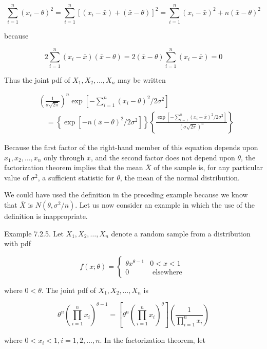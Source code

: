 $$
\sum_{i=1}^{n}\left(x_{i}-\theta\right)^{2}=\sum_{i=1}^{n}\left[\left(x_{i}-\bar{x}\right)+(\bar{x}-\theta)\right]^{2}=\sum_{i=1}^{n}\left(x_{i}-\bar{x}\right)^{2}+n(\bar{x}-\theta)^{2}
$$

because

$$
2 \sum_{i=1}^{n}\left(x_{i}-\bar{x}\right)(\bar{x}-\theta)=2(\bar{x}-\theta) \sum_{i=1}^{n}\left(x_{i}-\bar{x}\right)=0
$$

Thus the joint pdf of $X_{1}, X_{2}, \ldots, X_{n}$ may be written

$$
\begin{aligned}
& \left(\frac{1}{\sigma \sqrt{2 \pi}}\right)^{n} \exp \left[-\sum_{i=1}^{n}\left(x_{i}-\theta\right)^{2} / 2 \sigma^{2}\right] \\
& \quad=\left\{\exp \left[-n(\bar{x}-\theta)^{2} / 2 \sigma^{2}\right]\right\}\left\{\frac{\exp \left[-\sum_{i=1}^{n}\left(x_{i}-\bar{x}\right)^{2} / 2 \sigma^{2}\right]}{(\sigma \sqrt{2 \pi})^{n}}\right\}
\end{aligned}
$$

Because the first factor of the right-hand member of this equation depends upon $x_{1}, x_{2}, \ldots, x_{n}$ only through $\bar{x}$, and the second factor does not depend upon $\theta$, the factorization theorem implies that the mean $\bar{X}$ of the sample is, for any particular value of $\sigma^{2}$, a sufficient statistic for $\theta$, the mean of the normal distribution.

We could have used the definition in the preceding example because we know that $\bar{X}$ is $N\left(\theta, \sigma^{2} / n\right)$. Let us now consider an example in which the use of the definition is inappropriate.

Example 7.2.5. Let $X_{1}, X_{2}, \ldots, X_{n}$ denote a random sample from a distribution with pdf

$$
f(x ; \theta)= \begin{cases}\theta x^{\theta-1} & 0<x<1 \\ 0 & \text { elsewhere }\end{cases}
$$

where $0<\theta$. The joint pdf of $X_{1}, X_{2}, \ldots, X_{n}$ is

$$
\theta^{n}\left(\prod_{i=1}^{n} x_{i}\right)^{\theta-1}=\left[\theta^{n}\left(\prod_{i=1}^{n} x_{i}\right)^{\theta}\right]\left(\frac{1}{\prod_{i=1}^{n} x_{i}}\right)
$$

where $0<x_{i}<1, i=1,2, \ldots, n$. In the factorization theorem, let

